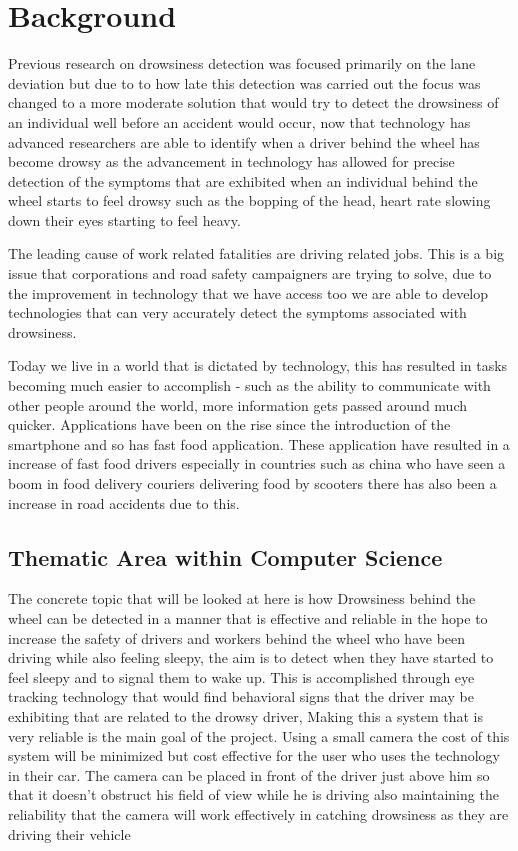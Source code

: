 \chapter{Background}
\label{chap:background}


Previous research on drowsiness detection was focused primarily on the lane deviation but due to to how late this detection was carried out the focus was changed to a more moderate solution that would try to detect the drowsiness of an individual well before an accident would occur, now that technology has advanced researchers are able to identify when a driver behind the wheel has become drowsy as the advancement in technology has allowed for precise detection of the symptoms that are exhibited when an individual behind the wheel starts to feel drowsy such as the bopping of the head, heart rate slowing down their eyes starting to feel heavy.

The leading cause of work related fatalities are driving related jobs. This is a big issue that corporations and road safety campaigners are trying to solve, due to the improvement in technology that we have access too we are able to develop technologies that can very accurately detect the symptoms associated with drowsiness.

Today we live in a world that is dictated by technology, this has resulted in tasks becoming much easier to accomplish - such as the ability to communicate with other people around the world, more information gets passed around much quicker. Applications have been on the rise since the introduction of the smartphone and so has fast food application. These application have resulted in a increase of fast food drivers especially in countries such as china who have seen a boom in food delivery couriers delivering food by scooters there has also been a increase in road accidents due to this. 

 
\section{Thematic Area within Computer Science}

The concrete topic that will be looked at here is how Drowsiness behind the wheel can be detected in a manner that is effective and reliable in the hope to increase the safety of drivers and workers behind the wheel who have been driving 
while also feeling sleepy, the aim is to detect when they have started to feel sleepy and to signal them to wake up. This is accomplished through eye tracking technology that would find behavioral signs that the driver may be exhibiting that are related to the drowsy driver, Making this a system that is very reliable is the main goal of the project. Using a small camera  the cost of this system will be minimized but cost effective for the user who uses the technology in their car. The camera can be placed in front of the driver just above him so that it doesn't obstruct his field of view while he is driving also maintaining the reliability that the camera will work effectively in catching drowsiness as they are driving their vehicle
  
